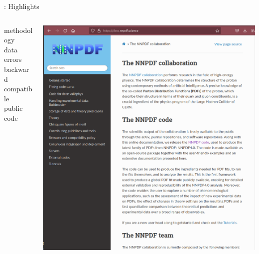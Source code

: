 \documentclass[9pt]{beamer}
\begin{document}
\begin{frame}{: Highlights}
    \begin{columns}
        \begin{column}{0.4\textwidth}
            \begin{description}
                \item[methodology]
                \item[data]
                \item[errors]
                \item[backward compatible]
                \item[public code]
            \end{description}
        \end{column}
        \begin{column}{0.5\textwidth}
            \begin{center}
                \includegraphics[width=1.1\textwidth]{nnpdf-docs}
            \end{center}
        \end{column}
    \end{columns}
\end{frame}
\end{document}
